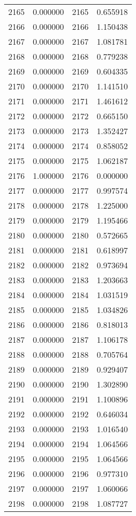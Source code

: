 \documentclass[12pt]{article}
\begin{document}
\begin{longtable}{@{}cccc@{}}
2165 & 0.000000 & 2165 & 0.655918 \\
2166 & 0.000000 & 2166 & 1.150438 \\
2167 & 0.000000 & 2167 & 1.081781 \\
2168 & 0.000000 & 2168 & 0.779238 \\
2169 & 0.000000 & 2169 & 0.604335 \\
2170 & 0.000000 & 2170 & 1.141510 \\
2171 & 0.000000 & 2171 & 1.461612 \\
2172 & 0.000000 & 2172 & 0.665150 \\
2173 & 0.000000 & 2173 & 1.352427 \\
2174 & 0.000000 & 2174 & 0.858052 \\
2175 & 0.000000 & 2175 & 1.062187 \\
2176 & 1.000000 & 2176 & 0.000000 \\
2177 & 0.000000 & 2177 & 0.997574 \\
2178 & 0.000000 & 2178 & 1.225000 \\
2179 & 0.000000 & 2179 & 1.195466 \\
2180 & 0.000000 & 2180 & 0.572665 \\
2181 & 0.000000 & 2181 & 0.618997 \\
2182 & 0.000000 & 2182 & 0.973694 \\
2183 & 0.000000 & 2183 & 1.203663 \\
2184 & 0.000000 & 2184 & 1.031519 \\
2185 & 0.000000 & 2185 & 1.034826 \\
2186 & 0.000000 & 2186 & 0.818013 \\
2187 & 0.000000 & 2187 & 1.106178 \\
2188 & 0.000000 & 2188 & 0.705764 \\
2189 & 0.000000 & 2189 & 0.929407 \\
2190 & 0.000000 & 2190 & 1.302890 \\
2191 & 0.000000 & 2191 & 1.100896 \\
2192 & 0.000000 & 2192 & 0.646034 \\
2193 & 0.000000 & 2193 & 1.016540 \\
2194 & 0.000000 & 2194 & 1.064566 \\
2195 & 0.000000 & 2195 & 1.064566 \\
2196 & 0.000000 & 2196 & 0.977310 \\
2197 & 0.000000 & 2197 & 1.060066 \\
2198 & 0.000000 & 2198 & 1.087727 \\

\end{longtable}
\end{document}
